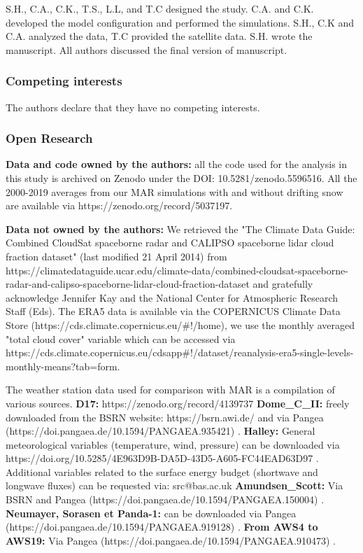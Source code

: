 \documentclass[draft]{agujournal2019}
\begin{document}
S.H., C.A., C.K., T.S., L.L, and T.C designed the study. C.A. and C.K. developed the model configuration and performed the simulations. S.H., C.K and C.A. analyzed the data, T.C provided the satellite data. S.H. wrote the manuscript. All authors discussed the final version of manuscript.

\subsubsection*{Competing interests}
The authors declare that they have no competing interests.

\subsubsection*{Open Research}
%
\textbf{Data and code owned by the authors:} all the code used for the analysis in this study is archived on Zenodo under the DOI: 10.5281/zenodo.5596516. All the 2000-2019 averages from our MAR simulations with and without drifting snow are available via https://zenodo.org/record/5037197. 


\textbf{Data not owned by the authors:} We retrieved the "The Climate Data Guide: Combined CloudSat spaceborne radar and CALIPSO spaceborne lidar cloud fraction dataset" (last modified 21 April 2014) from https://climatedataguide.ucar.edu/climate-data/combined-cloudsat-spaceborne-radar-and-calipso-spaceborne-lidar-cloud-fraction-dataset and gratefully acknowledge Jennifer Kay and the National Center for Atmospheric Research Staff (Eds). The ERA5 data is available via the COPERNICUS Climate Data Store \hfill \break 
(https://cds.climate.copernicus.eu/\#!/home), we use the monthly averaged "total cloud cover" variable which can be accessed via https://cds.climate.copernicus.eu/cdsapp\#!/dataset/reanalysis-era5-single-levels-monthly-means?tab=form.

The weather station data used for comparison with MAR is a compilation of various sources.\hfill \break 
\textbf{D17:} https://zenodo.org/record/4139737 \hfill \break 
\textbf{Dome\_C\_II:} freely downloaded from the BSRN website: https://bsrn.awi.de/ and via Pangea (https://doi.pangaea.de/10.1594/PANGAEA.935421) \cite{lupi2021}.\hfill \break 
\textbf{Halley:} General meteorological variables (temperature, wind, pressure) can be downloaded via https://doi.org/10.5285/4E963D9B-DA5D-43D5-A605-FC44EAD63D97 \cite{King2021}. Additional variables related to the surface energy budget (shortwave and longwave fluxes) can be requested via: src@bas.ac.uk \hfill \break 
\textbf{Amundsen\_Scott:} Via BSRN and Pangea (https://doi.pangaea.de/10.1594/PANGAEA.150004) \cite{dutton2015}.\hfill \break 
\textbf{Neumayer, Sorasen et Panda-1:} can be downloaded via Pangea \\
(https://doi.pangaea.de/10.1594/PANGAEA.919128) \cite{schmithusen2020}. \hfill \break 
\textbf{From AWS4 to AWS19:} Via Pangea (https://doi.pangaea.de/10.1594/PANGAEA.910473) \cite{jakobs2020}. \hfill \break 
\end{document}

